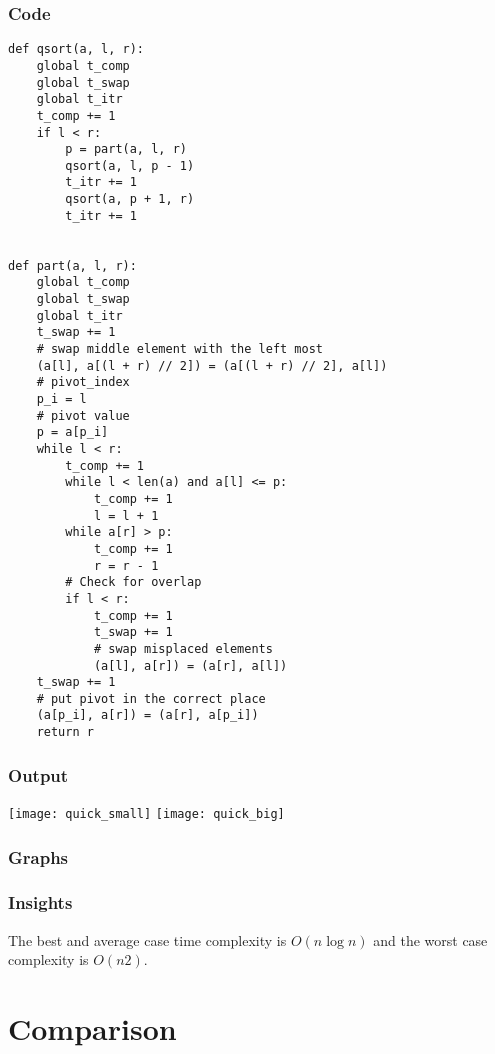 \documentclass[12pt]{article}
\begin{document}
\subsubsection*{Code}
\begin{verbatim}
def qsort(a, l, r):
    global t_comp
    global t_swap
    global t_itr
    t_comp += 1
    if l < r:
        p = part(a, l, r)
        qsort(a, l, p - 1)
        t_itr += 1
        qsort(a, p + 1, r)
        t_itr += 1


def part(a, l, r):
    global t_comp
    global t_swap
    global t_itr
    t_swap += 1
    # swap middle element with the left most
    (a[l], a[(l + r) // 2]) = (a[(l + r) // 2], a[l])
    # pivot_index
    p_i = l
    # pivot value
    p = a[p_i]
    while l < r:
        t_comp += 1
        while l < len(a) and a[l] <= p:
            t_comp += 1
            l = l + 1
        while a[r] > p:
            t_comp += 1
            r = r - 1
        # Check for overlap
        if l < r:
            t_comp += 1
            t_swap += 1
            # swap misplaced elements
            (a[l], a[r]) = (a[r], a[l])
    t_swap += 1
    # put pivot in the correct place
    (a[p_i], a[r]) = (a[r], a[p_i])
    return r
\end{verbatim}
\subsubsection*{Output}
\texttt{[image: quick\_small]}
\texttt{[image: quick\_big]}
\subsubsection*{Graphs}





\subsubsection*{Insights}
The best and average case time complexity is $O(n \log n)$ and the worst case
complexity is $O(n2)$.
\section{Comparison}





\end{document}
